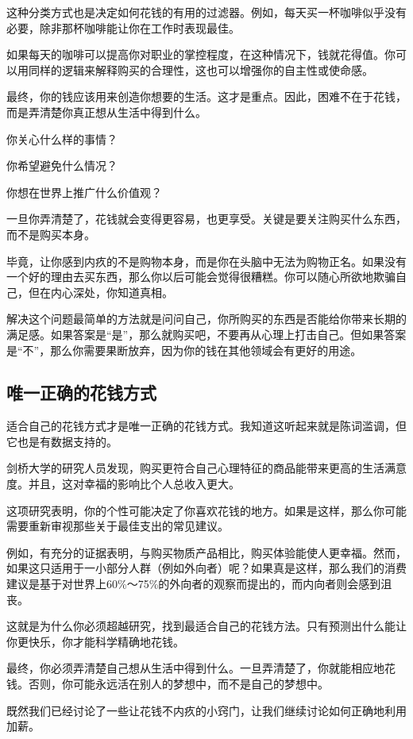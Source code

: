 这种分类方式也是决定如何花钱的有用的过滤器。例如，每天买一杯咖啡似乎没有必要，除非那杯咖啡能让你在工作时表现最佳。

如果每天的咖啡可以提高你对职业的掌控程度，在这种情况下，钱就花得值。你可以用同样的逻辑来解释购买的合理性，这也可以增强你的自主性或使命感。

最终，你的钱应该用来创造你想要的生活。这才是重点。因此，困难不在于花钱，而是弄清楚你真正想从生活中得到什么。

你关心什么样的事情？

你希望避免什么情况？

你想在世界上推广什么价值观？

一旦你弄清楚了，花钱就会变得更容易，也更享受。关键是要关注购买什么东西，而不是购买本身。

毕竟，让你感到内疚的不是购物本身，而是你在头脑中无法为购物正名。如果没有一个好的理由去买东西，那么你以后可能会觉得很糟糕。你可以随心所欲地欺骗自己，但在内心深处，你知道真相。

解决这个问题最简单的方法就是问问自己，你所购买的东西是否能给你带来长期的满足感。如果答案是“是”，那么就购买吧，不要再从心理上打击自己。但如果答案是“不”，那么你需要果断放弃，因为你的钱在其他领域会有更好的用途。

\subsection{唯一正确的花钱方式}
适合自己的花钱方式才是唯一正确的花钱方式。我知道这听起来就是陈词滥调，但它也是有数据支持的。

剑桥大学的研究人员发现，购买更符合自己心理特征的商品能带来更高的生活满意度。并且，这对幸福的影响比个人总收入更大。

这项研究表明，你的个性可能决定了你喜欢花钱的地方。如果是这样，那么你可能需要重新审视那些关于最佳支出的常见建议。

例如，有充分的证据表明，与购买物质产品相比，购买体验能使人更幸福。然而，如果这只适用于一小部分人群（例如外向者）呢？如果真是这样，那么我们的消费建议是基于对世界上60\%～75\%的外向者的观察而提出的，而内向者则会感到沮丧。

这就是为什么你必须超越研究，找到最适合自己的花钱方法。只有预测出什么能让你更快乐，你才能科学精确地花钱。

最终，你必须弄清楚自己想从生活中得到什么。一旦弄清楚了，你就能相应地花钱。否则，你可能永远活在别人的梦想中，而不是自己的梦想中。

既然我们已经讨论了一些让花钱不内疚的小窍门，让我们继续讨论如何正确地利用加薪。

